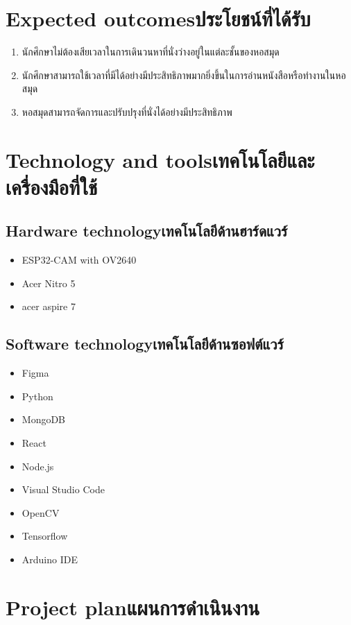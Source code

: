 \section{\ifenglish Expected outcomes\else ประโยชน์ที่ได้รับ\fi}
\begin{enumerate}
   \item นักศึกษาไม่ต้องเสียเวลาในการเดินวนหาที่นั่งว่างอยู่ในแต่ละชั้นของหอสมุด
   \item นักศึกษาสามารถใช้เวลาที่มีได้อย่างมีประสิทธิภาพมากยิ่งขึ้นในการอ่านหนังสือหรือทำงานในหอสมุด
   \item หอสมุดสามารถจัดการและปรับปรุงที่นั่งได้อย่างมีประสิทธิภาพ 
\end{enumerate}
\section{\ifenglish Technology and tools\else เทคโนโลยีและเครื่องมือที่ใช้\fi}

\subsection{\ifenglish Hardware technology\else เทคโนโลยีด้านฮาร์ดแวร์\fi}
\begin{itemize}
    \item ESP32-CAM with OV2640
    \item Acer Nitro 5
    \item acer aspire 7
\end{itemize}
\subsection{\ifenglish Software technology\else เทคโนโลยีด้านซอฟต์แวร์\fi}
\begin{itemize}
    \item Figma
    \item Python
    \item MongoDB
    \item React
    \item Node.js
    \item Visual Studio Code
    \item OpenCV
    \item Tensorflow
    \item Arduino IDE    
\end{itemize}
\section{\ifenglish Project plan\else แผนการดำเนินงาน\fi}

